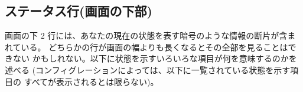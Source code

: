 \subsection*{ステータス行(画面の下部)}

画面の下 2 行には、あなたの現在の状態を表す暗号のような情報の断片が含まれている。
どちらかの行が画面の幅よりも長くなるとその全部を見ることはできない
かもしれない。以下に状態を示すいろいろな項目が何を意味するのかを述べる
(コンフィグレーションによっては、以下に一覧されている状態を示す項目の
すべてが表示されるとは限らない)。

